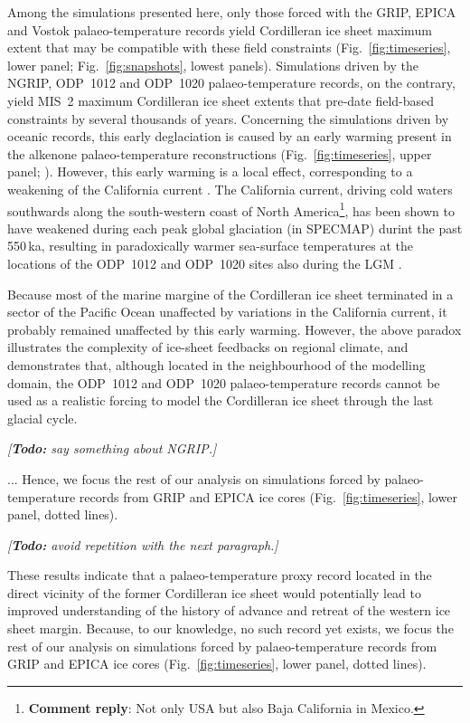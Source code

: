 \documentclass[tc, manuscript]{copernicus}
\newcommand{\renote}[1]{\footnote{\textbf{Comment reply}: #1}}
\newcommand{\todo}[1]{\emph{[\textbf{Todo:} #1]}}
\begin{document}
Among the simulations presented here, only those forced with the GRIP, EPICA
and Vostok palaeo-temperature records yield Cordilleran ice sheet maximum
extent that may be compatible with these field constraints
(Fig.~\ref{fig:timeseries}, lower panel; Fig.~\ref{fig:snapshots}, lowest
panels). Simulations driven by the NGRIP, ODP~1012 and ODP~1020
palaeo-temperature records, on the contrary, yield MIS~2 maximum Cordilleran
ice sheet extents that pre-date field-based constraints by several thousands of
years. Concerning the simulations driven by oceanic records, this early
deglaciation is caused by an early warming present in the alkenone
palaeo-temperature reconstructions (Fig.~\ref{fig:timeseries}, upper panel;
\citealp[Fig.3]{Herbert.etal.2001}). However, this
early warming is a local effect, corresponding to a weakening of the California
current \citep[Fig.~3]{Herbert.etal.2001}. The California current, driving cold
waters southwards along the south-western coast of North America\renote{
    Not only USA but also Baja California in Mexico.},
has been shown to have weakened during each peak global glaciation (in SPECMAP)
durint the past 550\,ka, resulting in paradoxically warmer sea-surface
temperatures at the locations of the ODP~1012 and ODP~1020 sites also during
the LGM \citep{Herbert.etal.2001}.

Because most of the marine margine of the Cordilleran ice sheet terminated in a
sector of the Pacific Ocean unaffected by variations in the California current,
it probably remained unaffected by this early warming. However, the above paradox
illustrates the complexity of ice-sheet feedbacks on regional climate, and
demonstrates that, although located in the neighbourhood of the modelling
domain, the ODP~1012 and ODP~1020 palaeo-temperature records cannot be
used as a realistic forcing to model the Cordilleran ice sheet
through the last glacial cycle.

\todo{say something about NGRIP.}

... Hence, we focus the rest of our analysis on simulations forced by palaeo-temperature records from GRIP and EPICA ice cores (Fig.~\ref{fig:timeseries}, lower panel, dotted lines).

\todo{avoid repetition with the next paragraph.}

These results indicate that a palaeo-temperature proxy record located in the
direct vicinity of the former Cordilleran ice sheet would potentially lead to
improved understanding of the history of advance and retreat of the western ice
sheet margin. Because, to our knowledge, no
such record yet exists, we focus the rest of our analysis on simulations forced
by palaeo-temperature records from GRIP and EPICA ice cores
(Fig.~\ref{fig:timeseries}, lower panel, dotted lines).
\end{document}
